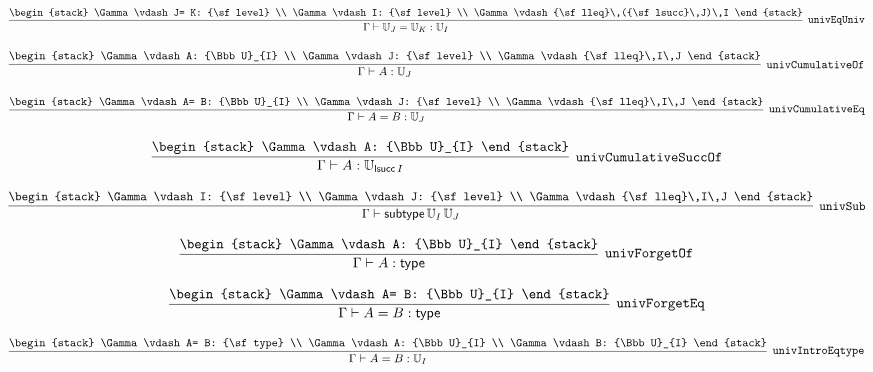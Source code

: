 \[
\infer[{\tt univEqUniv}]{\Gamma \vdash {\Bbb U}_{J}= {\Bbb U}_{K}: {\Bbb U}_{I}}{
\begin{stack}
\Gamma \vdash J= K: {\sf level}
\\
\Gamma \vdash I: {\sf level}
\\
\Gamma \vdash {\sf lleq}\,({\sf lsucc}\,J)\,I
\end{stack}}
\]

\[
\infer[{\tt univCumulativeOf}]{\Gamma \vdash A: {\Bbb U}_{J}}{
\begin{stack}
\Gamma \vdash A: {\Bbb U}_{I}
\\
\Gamma \vdash J: {\sf level}
\\
\Gamma \vdash {\sf lleq}\,I\,J
\end{stack}}
\]

\[
\infer[{\tt univCumulativeEq}]{\Gamma \vdash A= B: {\Bbb U}_{J}}{
\begin{stack}
\Gamma \vdash A= B: {\Bbb U}_{I}
\\
\Gamma \vdash J: {\sf level}
\\
\Gamma \vdash {\sf lleq}\,I\,J
\end{stack}}
\]

\[
\infer[{\tt univCumulativeSuccOf}]{\Gamma \vdash A: {\Bbb U}_{{\sf lsucc}\,I}}{
\begin{stack}
\Gamma \vdash A: {\Bbb U}_{I}
\end{stack}}
\]

\[
\infer[{\tt univSub}]{\Gamma \vdash {\sf subtype}\,{\Bbb U}_{I}\,{\Bbb U}_{J}}{
\begin{stack}
\Gamma \vdash I: {\sf level}
\\
\Gamma \vdash J: {\sf level}
\\
\Gamma \vdash {\sf lleq}\,I\,J
\end{stack}}
\]

\[
\infer[{\tt univForgetOf}]{\Gamma \vdash A: {\sf type}}{
\begin{stack}
\Gamma \vdash A: {\Bbb U}_{I}
\end{stack}}
\]

\[
\infer[{\tt univForgetEq}]{\Gamma \vdash A= B: {\sf type}}{
\begin{stack}
\Gamma \vdash A= B: {\Bbb U}_{I}
\end{stack}}
\]

\[
\infer[{\tt univIntroEqtype}]{\Gamma \vdash A= B: {\Bbb U}_{I}}{
\begin{stack}
\Gamma \vdash A= B: {\sf type}
\\
\Gamma \vdash A: {\Bbb U}_{I}
\\
\Gamma \vdash B: {\Bbb U}_{I}
\end{stack}}
\]

